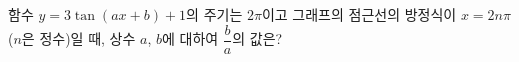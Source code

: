 함수 $y=3\tan(ax+b)+1$의 주기는 $2\pi$이고 그래프의 점근선의 방정식이 $x=2n\pi$ ($n$은 정수)일 때, 상수 $a$, $b$에 대하여 $\dfrac{b}{a}$의 값은? 
